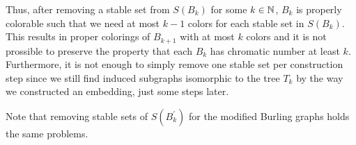 Thus, after removing a stable set from $S(B_k)$ for some $k\in\mathbb{N}$, $B_k$ is properly colorable such that we need at most $k-1$ colors for each stable set in $S(B_k)$. This results in proper colorings of $B_{k+1}$ with at most $k$ colors and it is not prossible to preserve the property that each $B_k$ has chromatic number at least $k$. Furthermore, it is not enough to simply remove one stable set per construction step since we still find induced subgraphs isomorphic to the tree $T_k$ by the way we constructed an embedding, just some steps later.

Note that removing stable sets of $S(B_k^\prime )$ for the modified Burling graphs holds the same problems.